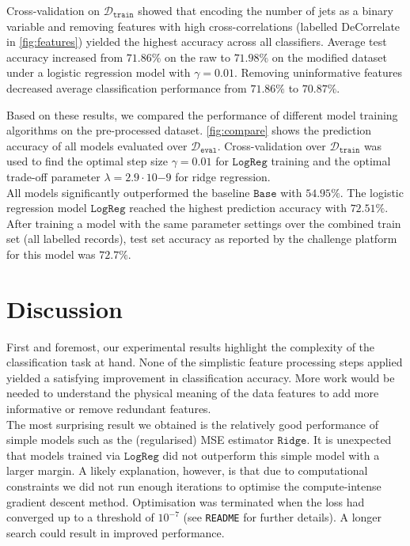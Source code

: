 \documentclass[10pt,conference,compsocconf]{IEEEtran}
\newcommand{\Deval}{\mathcal{D}_{\mathtt{eval}}}
\newcommand{\Dtrain}{\mathcal{D}_{\mathtt{train}}}
\newcommand{\Baseline}{\mathtt{Base}}
\newcommand{\Ridge}{\mathtt{Ridge}}
\newcommand{\LogReg}{\mathtt{LogReg}}
\begin{document}
Cross-validation on $\Dtrain$ showed that encoding the number of jets as a binary variable and removing features with high cross-correlations (labelled DeCorrelate in \autoref{fig:features}) yielded the highest accuracy across all classifiers. Average test accuracy increased from $71.86\%$ on the raw to $71.98\%$ on the modified dataset under a logistic regression model with $\gamma = 0.01$. Removing uninformative features decreased average classification performance from $71.86\%$ to $70.87\%$.

Based on these results, we compared the performance of different model training algorithms on the pre-processed dataset. \autoref{fig:compare} shows the prediction accuracy of all models evaluated over $\Deval$. Cross-validation over $\Dtrain$ was used to find the optimal step size $\gamma=0.01$ for $\LogReg$ training and the optimal trade-off parameter $\lambda=2.9 \cdot 10{-9}$ for ridge regression.\\
All models significantly outperformed the baseline $\Baseline$ with $54.95\%$. The logistic regression model $\LogReg$ reached the highest prediction accuracy with $72.51\%$. After training a model with the same parameter settings over the combined train set (all labelled records), test set accuracy as reported by the challenge platform for this model was $72.7\%$. 

\section{Discussion}
First and foremost, our experimental results highlight the complexity of the classification task at hand. None of the simplistic feature processing steps applied yielded a satisfying improvement in classification accuracy. More work would be needed to understand the physical meaning of the data features to add more informative or remove redundant features.\\
The most surprising result we obtained is the relatively good performance of simple models such as the (regularised) MSE estimator $\Ridge$. It is unexpected that models trained via $\LogReg$ did not outperform this simple model with a larger margin. A likely explanation, however, is that due to computational constraints we did not run enough iterations to optimise the compute-intense gradient descent method. Optimisation was terminated when the loss had converged up to a threshold of $10^{-7}$ (see \texttt{README} for further details). A longer search could result in improved performance.\\




\end{document}
